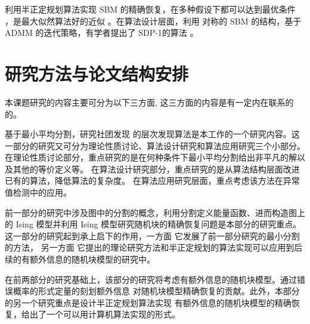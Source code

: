 利用半正定规划算法实现 SBM 的精确恢复，在多种假设下都可以达到最优条件 \cite{hajek2016achieving}，是最大似然算法好的近似 。在算法设计层面，利用 对称的 SBM 的结构，基于 ADMM 的迭代策略，有学者提出了 SDP-1的算法 \cite{amini2018semidefinite}。

\section{研究方法与论文结构安排}
本课题研究的内容主要可分为以下三方面, 这三方面的内容是有一定内在联系的
的。

基于最小平均分割，研究社团发现
的层次发现算法是本工作的一个研究内容。这一部分的研究又可分为理论性质讨论、算法设计研究和算法应用研究三个小部分。
在理论性质讨论部分，重点研究的是在何种条件下最小平均分割给出非平凡的解以及其他的等价定义等。
在算法设计研究部分，重点研究的是从算法结构层面改进已有的算法，降低算法的复杂度。
在算法应用研究层面，重点考虑该方法在异常值检测中的应用。

前一部分的研究中涉及图中的分割的概念，利用分割定义能量函数、进而构造图上的 Ising 模型并利用
Ising 模型研究随机块的精确恢复问题是本部分的研究重点。这一部分的研究起到承上启下的作用，一方面
它发展了前一部分研究的最小分割的方法，
另一方面
它提出的理论研究方法和半正定规划的算法实现可以应用到后续的有额外信息的随机块模型的研究中。

在前两部分的研究基础上，该部分的研究将考虑有额外信息的随机块模型。通过错误概率的形式定量的刻划额外信息
对随机块模型精确恢复的贡献。此外，本部分的另一个研究重点是设计半正定规划算法实现
有额外信息的随机块模型的精确恢复，给出了一个可以用计算机算法实现的形式。
